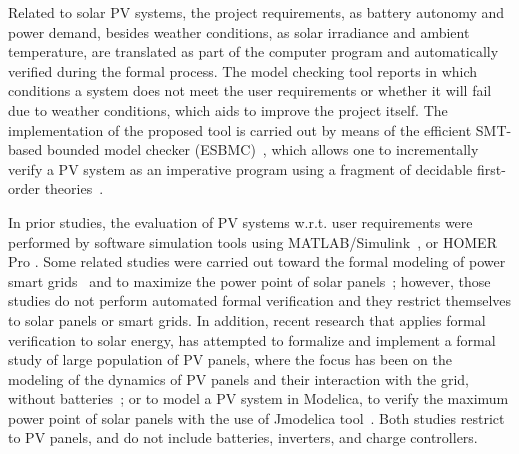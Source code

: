 \documentclass[journal]{IEEEtran}
\begin{document}
Related to solar PV systems, the project requirements, as battery autonomy and power demand, besides weather conditions, as solar irradiance and ambient temperature, are translated as part of the computer program and automatically verified during the formal process. The model checking tool reports in which conditions a system does not meet the user requirements or whether it will fail due to weather conditions, which aids to improve the project itself.  
The implementation of the proposed tool is carried out by means of the efficient SMT-based bounded model checker (ESBMC)~\cite{esbmc2018}, which allows one to incrementally verify a PV system as an imperative program using a fragment of decidable first-order theories~\cite{DBLP:books/daglib/0019162}.

In prior studies, the evaluation of PV systems w.r.t. user requirements were performed by software simulation tools using MATLAB/Simulink~\cite{Benatiallah2017, Samrat2014, Natsheh2012}, or HOMER Pro \cite{Lamnadi2017}. Some related studies were carried out toward the formal modeling of power smart grids~\cite{Akram2018} and to maximize the power point of solar panels~\cite{Driouich2017}; however, those studies do not perform automated formal verification and they restrict themselves to solar panels or smart grids. 
%
In addition, recent research that applies formal verification to solar energy, has attempted to formalize and implement a formal study of large population of PV panels, where the focus has been on the modeling of the dynamics of PV panels and their interaction with the grid, without batteries~\cite{Abate2017}; or to model a PV system in Modelica, to verify the maximum power point of solar panels with the use of Jmodelica tool~\cite{Driouich2018}. Both studies restrict to PV panels, and do not include batteries, inverters, and charge controllers.
  
\end{document}

